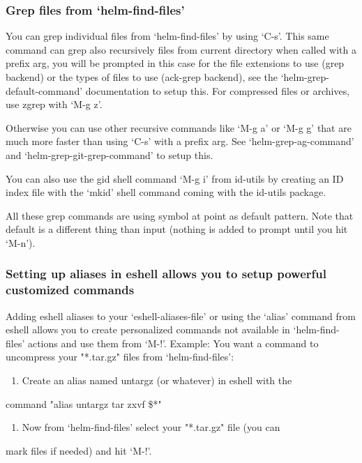 \documentclass[11pt]{article}
\begin{document}
\subsubsection{Grep files from ‘helm-find-files’}
\label{sec:orge87082d}

You can grep individual files from ‘helm-find-files’ by using
‘C-s’.  This same command can
grep also recursively files from current directory when called with a
prefix arg, you will be prompted in this case for the file extensions
to use (grep backend) or the types of files to use (ack-grep backend),
see the ‘helm-grep-default-command’ documentation to setup this.
For compressed files or archives, use zgrep with
‘M-g z’.

Otherwise you can use other recursive commands like
‘M-g a’ or ‘M-g g’ that are much more
faster than using ‘C-s’ with a
prefix arg.  See ‘helm-grep-ag-command’ and
‘helm-grep-git-grep-command’ to setup this.

You can also use the gid shell command
‘M-g i’ from id-utils by creating
an ID index file with the ‘mkid’ shell command coming with the
id-utils package.

All these grep commands are using symbol at point as default pattern.
Note that default is a different thing than input (nothing is added to
prompt until you hit ‘M-n’).

\subsubsection{Setting up aliases in eshell allows you to setup powerful customized commands}
\label{sec:org2f0273d}

Adding eshell aliases to your ‘eshell-aliases-file’ or using the
‘alias’ command from eshell allows you to create personalized commands
not available in ‘helm-find-files’ actions and use them from ‘M-!’.
Example:
You want a command to uncompress your "*.tar.gz" files from ‘helm-find-files’:

\begin{enumerate}
\item Create an alias named untargz (or whatever) in eshell with the
\end{enumerate}
command "alias untargz tar zxvf \$*"

\begin{enumerate}
\item Now from ‘helm-find-files’ select your "*.tar.gz" file (you can
\end{enumerate}
mark files if needed) and hit ‘M-!’.
\end{document}
